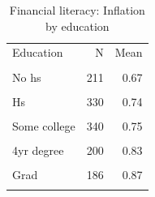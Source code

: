 \begin{table}[htbp]\centering\small
\caption{Financial literacy: Inflation by education}
\label{tab:finlit_q2_by_educ}
\begin{tabular}{lrr}\toprule
Education & N & Mean \\\\ \midrule
No hs & 211 & 0.67 \\\\
Hs & 330 & 0.74 \\\\
Some college & 340 & 0.75 \\\\
4yr degree & 200 & 0.83 \\\\
Grad & 186 & 0.87 \\\\
\bottomrule
\end{tabular}\end{table}
